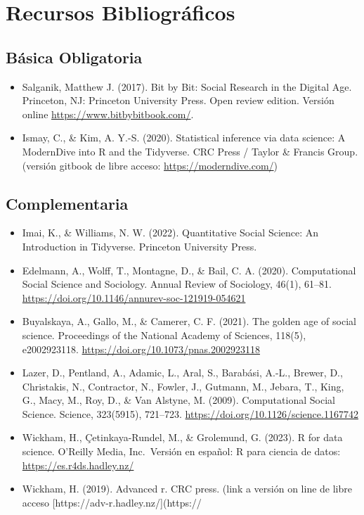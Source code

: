 \documentclass[11pt,letter,]{article}
\providecommand{\tightlist}{%
  \setlength{\itemsep}{0pt}\setlength{\parskip}{0pt}}
\begin{document}
\hypertarget{recursos-bibliogruxe1ficos}{%
\section{Recursos Bibliográficos}\label{recursos-bibliogruxe1ficos}}

\hypertarget{buxe1sica-obligatoria}{%
\subsection{Básica Obligatoria}\label{buxe1sica-obligatoria}}

\begin{itemize}
\tightlist
\item
  Salganik, Matthew J. (2017). Bit by Bit: Social Research in the
  Digital Age. Princeton, NJ: Princeton University Press. Open review
  edition. Versión online \url{https://www.bitbybitbook.com/}.
\item
  Ismay, C., \& Kim, A. Y.-S. (2020). Statistical inference via data
  science: A ModernDive into R and the Tidyverse. CRC Press / Taylor \&
  Francis Group. (versión gitbook de libre acceso:
  \url{https://moderndive.com/})
\end{itemize}

\hypertarget{complementaria}{%
\subsection{Complementaria}\label{complementaria}}

\begin{itemize}
\tightlist
\item
  Imai, K., \& Williams, N. W. (2022). Quantitative Social Science: An
  Introduction in Tidyverse. Princeton University Press.
\item
  Edelmann, A., Wolff, T., Montagne, D., \& Bail, C. A. (2020).
  Computational Social Science and Sociology. Annual Review of
  Sociology, 46(1), 61--81.
  \url{https://doi.org/10.1146/annurev-soc-121919-054621}
\item
  Buyalskaya, A., Gallo, M., \& Camerer, C. F. (2021). The golden age of
  social science. Proceedings of the National Academy of Sciences,
  118(5), e2002923118. \url{https://doi.org/10.1073/pnas.2002923118}
\item
  Lazer, D., Pentland, A., Adamic, L., Aral, S., Barabási, A.-L.,
  Brewer, D., Christakis, N., Contractor, N., Fowler, J., Gutmann, M.,
  Jebara, T., King, G., Macy, M., Roy, D., \& Van Alstyne, M. (2009).
  Computational Social Science. Science, 323(5915), 721--723.
  \url{https://doi.org/10.1126/science.1167742}
\item
  Wickham, H., Çetinkaya-Rundel, M., \& Grolemund, G. (2023). R for data
  science. O'Reilly Media, Inc.~Versión en español: R para ciencia de
  datos: \url{https://es.r4ds.hadley.nz/}
\item
  Wickham, H. (2019). Advanced r. CRC press. (link a versión on line de
  libre acceso {[}https://adv-r.hadley.nz/{]}(https://
\end{itemize}
\end{document}
